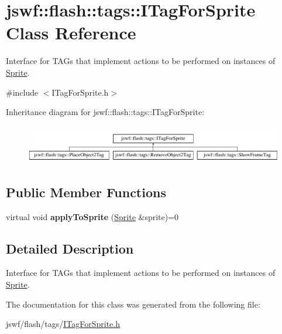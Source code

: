 \hypertarget{classjswf_1_1flash_1_1tags_1_1_i_tag_for_sprite}{\section{jswf\+:\+:flash\+:\+:tags\+:\+:I\+Tag\+For\+Sprite Class Reference}
\label{classjswf_1_1flash_1_1tags_1_1_i_tag_for_sprite}
}


Interface for {\ttfamily T\+A\+G}s that implement actions to be performed on instances of \hyperlink{classjswf_1_1flash_1_1_sprite}{Sprite}.  




{\ttfamily \#include $<$I\+Tag\+For\+Sprite.\+h$>$}

Inheritance diagram for jswf\+:\+:flash\+:\+:tags\+:\+:I\+Tag\+For\+Sprite\+:\begin{figure}[H]
\begin{center}
\leavevmode
\includegraphics[height=1.696970cm]{classjswf_1_1flash_1_1tags_1_1_i_tag_for_sprite}
\end{center}
\end{figure}
\subsection*{Public Member Functions}
\begin{DoxyCompactItemize}
\item 
\hypertarget{classjswf_1_1flash_1_1tags_1_1_i_tag_for_sprite_a335f90384979e16cf1459de8168d929f}{virtual void {\bfseries apply\+To\+Sprite} (\hyperlink{classjswf_1_1flash_1_1_sprite}{Sprite} \&sprite)=0}\label{classjswf_1_1flash_1_1tags_1_1_i_tag_for_sprite_a335f90384979e16cf1459de8168d929f}

\end{DoxyCompactItemize}


\subsection{Detailed Description}
Interface for {\ttfamily T\+A\+G}s that implement actions to be performed on instances of \hyperlink{classjswf_1_1flash_1_1_sprite}{Sprite}. 

The documentation for this class was generated from the following file\+:\begin{DoxyCompactItemize}
\item 
jswf/flash/tags/\hyperlink{_i_tag_for_sprite_8h}{I\+Tag\+For\+Sprite.\+h}\end{DoxyCompactItemize}
